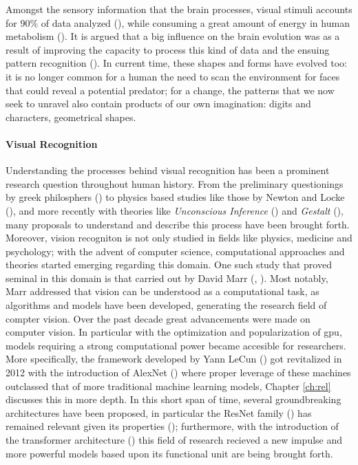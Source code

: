 Amongst the sensory information that the brain processes, visual stimuli accounts 
for 90\% of data analyzed (\cite{potter2014detecting}), while consuming a great amount of energy 
in human metabolism (\cite{phelps1981metabolic}). It is argued that a big influence on the 
brain evolution was as a result of improving the capacity to process this kind of data and the 
ensuing  pattern recognition (\cite{mattson2014superior}). 
In current time, these shapes and forms have evolved too: it is no longer common for a human
the need to scan the environment for faces that could reveal a potential predator; for a change, 
the patterns that we now seek to unravel also contain products of our own imagination: digits and 
characters, geometrical shapes.\\

\paragraph{Visual Recognition} Understanding the processes behind visual recognition has been a 
prominent research question throughout human history. From the preliminary questionings by greek  
philosphers (\cite{finger2001origins}) to physics based studies like those by Newton and Locke 
(\cite{swenson2010optics}), and more recently with theories like \textit{Unconscious Inference} 
(\cite{gullstrand1909hemholtz}) and \textit{Gestalt} (\cite{wagemans2012century}), many proposals 
to understand and describe this process have been brought forth. Moreover, vision recogniton is not 
only studied in fields like physics, medicine and psychology; 
with the advent of computer science, computational approaches and theories started emerging 
regarding this domain. One such study that proved seminal in this domain is that carried out by 
David Marr (\cite{poggio1981marr}, \cite{marr2010vision}). Most notably, Marr addressed that vision 
can be understood as a computational task, as algorithms and models have been 
developed, generating the research field of compter vision. 
Over the past decade great advancements were made on computer vision. In particular with the 
optimization and popularization of \gls{gpu}, models requiring a strong computational power became 
accesible for researchers. More specifically, the framework developed by Yann LeCun 
(\cite{lecun1998gradient}) got revitalized in 2012 with the introduction of AlexNet 
(\cite{krizhevsky2012imagenet}) where proper leverage of these machines outclassed that of 
more traditional machine learning models, Chapter \ref{ch:rel} discusses this in more depth. 
In this short span of time, several groundbreaking architectures have been proposed, in 
particular the ResNet family (\cite{he2016deep}) has remained relevant given its properties
(\cite{wightman2021resnet}); furthermore, with the introduction of the transformer architecture 
(\cite{vaswani2017attention}) this field of research recieved a new impulse and more powerful models 
based upon its functional unit are being brought forth.\\

